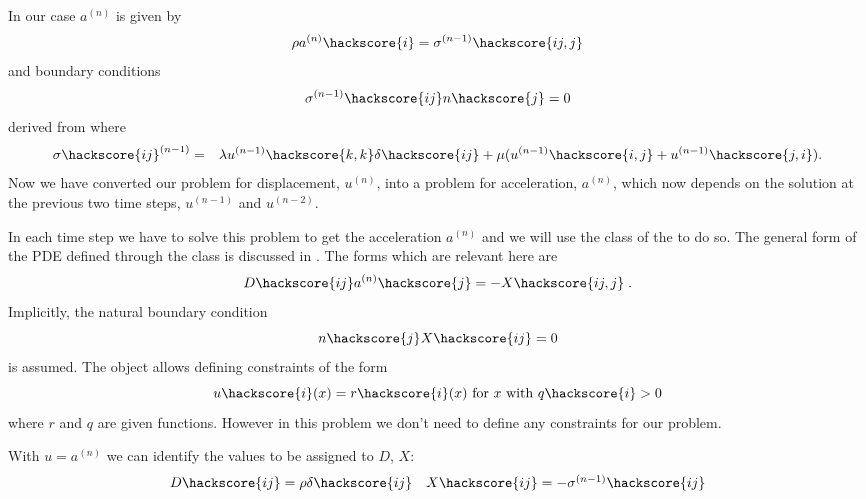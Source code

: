 In our case $a^{(n)}$ is given by
\begin{eqnarray}\label{WAVE dyn 3}
\rho a^{(n)}\hackscore{i}=\sigma^{(n-1)}\hackscore{ij,j}
\end{eqnarray}
and boundary conditions
\begin{eqnarray} \label{WAVE natural at n}
\sigma^{(n-1)}\hackscore{ij}n\hackscore{j}=0
\end{eqnarray}
derived from  where 
\begin{eqnarray} \label{WAVE dyn 3a}
\sigma\hackscore{ij}^{(n-1)} & = & \lambda u^{(n-1)}\hackscore{k,k} \delta\hackscore{ij} + \mu ( u^{(n-1)}\hackscore{i,j} + u^{(n-1)}\hackscore{j,i}).
\end{eqnarray}
Now we have converted our problem for displacement, $u^{(n)}$, into a problem for 
acceleration, $a^(n)$, which now depends 
on the solution at the previous two time steps, $u^{(n-1)}$  and $u^{(n-2)}$.

In each time step we have to solve this problem to get the acceleration $a^{(n)}$ and we will
use the \LinearPDE class of the \linearPDEs to do so. The general form of the PDE defined through
the \LinearPDE class is discussed in . The forms which are relevant here are  
\begin{equation}\label{WAVE dyn 100}
D\hackscore{ij} a^{(n)}\hackscore{j} = - X\hackscore{ij,j}\; .
\end{equation}
Implicitly, the natural boundary condition
\begin{equation}\label{WAVE dyn 101}
n\hackscore{j}X\hackscore{ij} =0 
\end{equation}
is assumed. The \LinearPDE object allows defining constraints of the form
\begin{equation}\label{WAVE dyn 102}
u\hackscore{i}(x)=r\hackscore{i}(x) \mbox{ for } x \mbox{ with } q\hackscore{i}>0
\end{equation}
where $r$ and $q$ are given functions. However in this problem we don't need to define 
any constraints for our problem.

With $u=a^{(n)}$ we can identify the values to be assigned to $D$, $X$:
\begin{equation}\label{WAVE  dyn 6}
\begin{array}{ll}
D\hackscore{ij}=\rho \delta\hackscore{ij}&
X\hackscore{ij}=-\sigma^{(n-1)}\hackscore{ij} \\
\end{array}
\end{equation}



